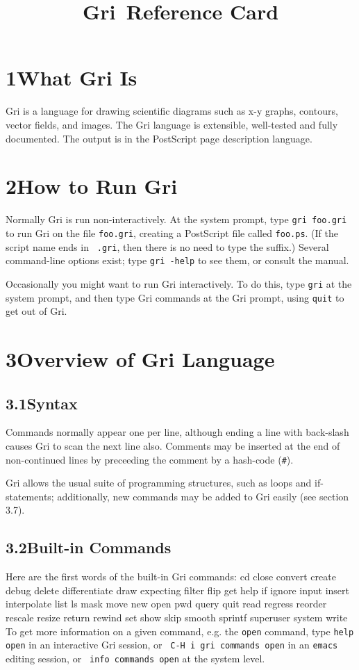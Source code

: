 

\title{Gri \griversion$\,$Reference Card}



\section{1\quad What Gri Is}
Gri is a language for drawing scientific diagrams such as x-y graphs,
contours, vector fields, and images.  The Gri language is extensible,
well-tested and fully documented.  The output is in the PostScript
page description language.

\section{2\quad How to Run Gri}
Normally Gri is run non-interactively.  At the system prompt, type
{\tt gri foo.gri} to run Gri on the file {\tt foo.gri}, creating a
PostScript file called {\tt foo.ps}.  (If the script name ends in {\tt
.gri}, then there is no need to type the suffix.)  Several
command-line options exist; type {\tt gri -help} to see them, or
consult the manual.

Occasionally you might want to run Gri interactively.  To do this,
type {\tt gri} at the system prompt, and then type Gri commands at the
Gri prompt, using {\tt quit} to get out of Gri.


\section{3\quad Overview of Gri Language}
\subsection{3.1\quad Syntax}
Commands normally appear one per line, although ending a line with
back-slash causes Gri to scan the next line also.  Comments may be
inserted at the end of non-continued lines by preceeding the comment
by a hash-code ({\tt \#}).

Gri allows the usual suite of programming structures, such as loops
and if-statements; additionally, new commands may be added to Gri
easily (see section 3.7).

\subsection{3.2\quad Built-in Commands}

Here are the first words of the built-in Gri commands:
\beginexample
cd      close         convert     create    debug
delete  differentiate draw        expecting filter
flip    get           help        if        ignore
input   insert        interpolate list      ls
mask    move          new         open      pwd
query   quit          read        regress   reorder
rescale resize        return      rewind    set
show    skip          smooth      sprintf   superuser
system  write
\endexample
To get more information on a given command, e.g. the {\tt open}
command, type {\tt help open} in an interactive Gri session, or {\tt
C-H i gri commands open} in an {\tt emacs} editing session, or {\tt
info commands open} at the system level.


